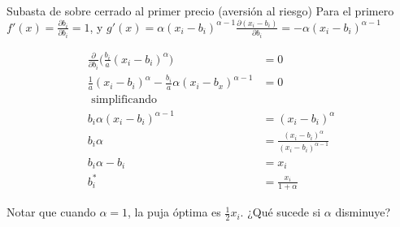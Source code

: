 \documentclass[12pt]{article}
\begin{document}
\begin{exbox}{Subasta de sobre cerrado al primer precio (aversión al riesgo)}
{		Para el primero $f'(x) = \frac{\partial b_i}{\partial b_i} = 1$, y $g'(x)=\alpha(x_i-b_i)^{\alpha - 1}\frac{\partial(x_i-b_i)}{\partial b_i} = -\alpha(x_i-b_i)^{\alpha-1}$
	}

	\begin{align*}
		\frac{\partial}{\partial b_i} \Biggl( \frac{b_i}{a}(x_i - b_i)^\alpha\Biggr) & = 0                                                 \\
		\frac{1}{a}(x_i - b_i)^\alpha -\frac{b_i}{a}\alpha(x_i-b_x)^{\alpha - 1}     & =0                                                  \\
		\text{ simplificando }                                                       &                                                     \\
		b_i\alpha(x_i - b_i)^{\alpha - 1}                                            & = (x_i - b_i)^\alpha                                \\
		b_i\alpha                                                                    & = \frac{(x_i - b_i)^\alpha}{(x_i - b_i)^{\alpha-1}} \\
		b_i\alpha - b_i                                                              & = x_i                                               \\
		b_i^*                                                                        & = \frac{x_i}{1+\alpha}
	\end{align*}

	Notar que cuando $\alpha=1$, la puja óptima es $\frac{1}{2}x_i$. ¿Qué sucede si $\alpha$ disminuye?
	\newcommand\bid[1]{x/(1 + #1)}

	\begin{center}
	\end{center}


\end{exbox}
\end{document}
